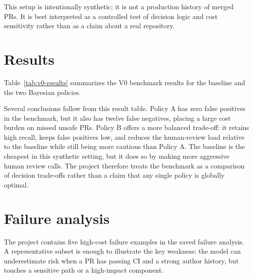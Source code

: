 \documentclass{article}
\begin{document}
This setup is intentionally synthetic; it is not a production history of merged PRs. It is best interpreted as a controlled test of decision logic and cost sensitivity rather than as a claim about a real repository.

\section{Results}

Table~\ref{tab:v0-results} summarizes the V0 benchmark results for the baseline and the two Bayesian policies.

\begin{table}[t]
\centering
\caption{V0 benchmark results on 30 synthetic PR cases. Precision and recall are computed against the binary unsafe-vs-safe target; total decision cost uses the project cost matrix.}
\label{tab:v0-results}
\end{table}

Several conclusions follow from this result table. Policy A has zero false positives in the benchmark, but it also has twelve false negatives, placing a large cost burden on missed unsafe PRs. Policy B offers a more balanced trade-off: it retains high recall, keeps false positives low, and reduces the human-review load relative to the baseline while still being more cautious than Policy A. The baseline is the cheapest in this synthetic setting, but it does so by making more aggressive human review calls. The project therefore treats the benchmark as a comparison of decision trade-offs rather than a claim that any single policy is globally optimal.

\section{Failure analysis}

The project contains five high-cost failure examples in the saved failure analysis. A representative subset is enough to illustrate the key weakness: the model can underestimate risk when a PR has passing CI and a strong author history, but touches a sensitive path or a high-impact component.
\end{document}
